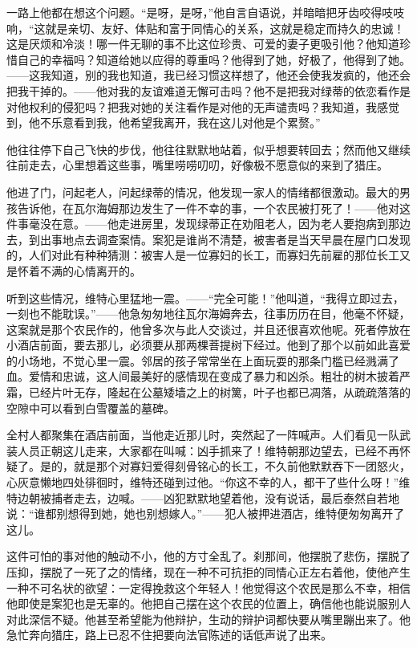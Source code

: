 \documentclass[12pt,oneside]{book}
\begin{document}
\begin{framed}
一路上他都在想这个问题。“是呀，是呀，”他自言自语说，并暗暗把牙齿咬得吱吱响，“这就是亲切、友好、体贴和富于同情心的关系，这就是稳定而持久的忠诚！这是厌烦和冷淡！哪一件无聊的事不比这位珍贵、可爱的妻子更吸引他？他知道珍惜自己的幸福吗？知道给她以应得的尊重吗？他得到了她，好极了，他得到了她。——这我知道，别的我也知道，我已经习惯这样想了，他还会使我发疯的，他还会把我干掉的。——他对我的友谊难道无懈可击吗？他不是把我对绿蒂的依恋看作是对他权利的侵犯吗？把我对她的关注看作是对他的无声谴责吗？我知道，我感觉到，他不乐意看到我，他希望我离开，我在这儿对他是个累赘。”

他往往停下自己飞快的步伐，他往往默默地站着，似乎想要转回去；然而他又继续往前走去，心里想着这些事，嘴里唠唠叨叨，好像极不愿意似的来到了猎庄。

他进了门，问起老人，问起绿蒂的情况，他发现一家人的情绪都很激动。最大的男孩告诉他，在瓦尔海姆那边发生了一件不幸的事，一个农民被打死了！——他对这件事毫没在意。——他走进房里，发现绿蒂正在劝阻老人，因为老人要抱病到那边去，到出事地点去调查案情。案犯是谁尚不清楚，被害者是当天早晨在屋门口发现的，人们对此有种种猜测：被害人是一位寡妇的长工，而寡妇先前雇的那位长工又是怀着不满的心情离开的。

听到这些情况，维特心里猛地一震。——“完全可能！”他叫道，“我得立即过去，一刻也不能耽误。”——他急匆匆地往瓦尔海姆奔去，往事历历在目，他毫不怀疑，这案就是那个农民作的，他曾多次与此人交谈过，并且还很喜欢他呢。死者停放在小酒店前面，要去那儿，必须要从那两棵菩提树下经过。他到了那个以前如此喜爱的小场地，不觉心里一震。邻居的孩子常常坐在上面玩耍的那条门槛已经溅满了血。爱情和忠诚，这人间最美好的感情现在变成了暴力和凶杀。粗壮的树木披着严霜，已经片叶无存，隆起在公墓矮墙之上的树篱，叶子也都已凋落，从疏疏落落的空隙中可以看到白雪覆盖的墓碑。

全村人都聚集在酒店前面，当他走近那儿时，突然起了一阵喊声。人们看见一队武装人员正朝这儿走来，大家都在叫喊：凶手抓来了！维特朝那边望去，已经不再怀疑了。是的，就是那个对寡妇爱得刻骨铭心的长工，不久前他默默吞下一团怒火，心灰意懒地四处徘徊时，维特还碰到过他。“你这不幸的人，都干了些什么呀！”维特边朝被捕者走去，边喊。——凶犯默默地望着他，没有说话，最后泰然自若地说：“谁都别想得到她，她也别想嫁人。”——犯人被押进酒店，维特便匆匆离开了这儿。

这件可怕的事对他的触动不小，他的方寸全乱了。刹那间，他摆脱了悲伤，摆脱了压抑，摆脱了一死了之的情绪，现在一种不可抗拒的同情心正左右着他，使他产生一种不可名状的欲望：一定得挽救这个年轻人！他觉得这个农民是那么不幸，相信他即使是案犯也是无辜的。他把自己摆在这个农民的位置上，确信他也能说服别人对此深信不疑。他甚至希望能为他辩护，生动的辩护词都快要从嘴里蹦出来了。他急忙奔向猎庄，路上已忍不住把要向法官陈述的话低声说了出来。


\end{framed}
\end{document}
